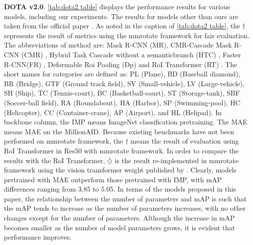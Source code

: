 \textbf{DOTA v2.0}. \autoref{tab:dota2 table} displays the performance results for various models, including our experiments. The results for models other than ours are taken from the official paper \cite{ding2021object}. As noted in the caption of \autoref{tab:dota2 table}, the $\dagger$ represents the result of metrics using the mmrotate framework for fair evaluation. {The abbreviations of method are: Mask R-CNN (MR)\cite{he2017mask}, CMR-Cascade Mask R-CNN (CMR) \cite{chen2019hybrid}, Hybrid Task Cascade without a semanticbranch (HTC) \cite{chen2019hybrid}, Faster R-CNN(FR) \cite{xia2018dota}, Deformable Roi Pooling (Dp) \cite{dai2017deformable} and RoI Transformer (RT) \cite{ding2019learning}. The short names for categories are defined as: PL (Plane), BD (Baseball diamond), BR (Bridge), GTF (Ground track field), SV (Small-vehicle), LV (Large-vehicle), SH (Ship), TC (Tennis-court), BC (Basketball-court), ST (Storage-tank), SBF (Soccer-ball field), RA (Roundabout), HA (Harbor), SP (Swimming-pool), HC (Helicopter), CC (Container-crane), AP (Airport), and HL (Helipad). In backbone column, the IMP means ImageNet classification pretraining. The MAE means MAE on the MillionAID.  Because existing benchmarks have not been performed on mmrotate framework, the $\dagger$ means the result of evaluation using RoI Transformer in Res50 with mmrotate framework. In order to compare the results with the RoI Transformer, $\diamondsuit$ is the result re-implemented in mmrotate framework using the vision transformer weight published by \cite{wang2022advancing}.} Clearly, models pretrained with MAE outperform those pretrained with IMP, with mAP differences ranging from 3.85 to 5.05. In terms of the models proposed in this paper, the relationship between the number of parameters and mAP is such that the mAP tends to increase as the number of parameters increases, with no other changes except for the number of parameters. Although the increase in mAP becomes smaller as the number of model parameters grows, it is evident that performance improves.

